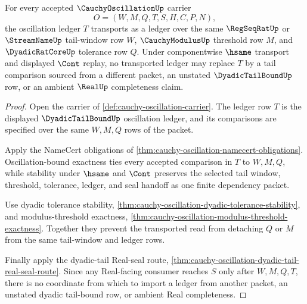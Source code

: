 \begin{theorem}
\label{thm:cauchy-oscillation-ledger-transport}
For every accepted $\CauchyOscillationUp$ carrier
$$
O=(W,M,Q,T,S,H,C,P,N),
$$
the oscillation ledger $T$ transports as a ledger over the same $\RegSeqRatUp$ or $\StreamNameUp$ tail-window row $W$, $\CauchyModulusUp$ threshold row $M$, and $\DyadicRatCoreUp$ tolerance row $Q$. Under componentwise $\hsame$ transport and displayed $\Cont$ replay, no transported ledger may replace $T$ by a tail comparison sourced from a different packet, an unstated $\DyadicTailBoundUp$ row, or an ambient $\RealUp$ completeness claim.
\end{theorem}
\begin{proof}
Open the carrier of \autoref{def:cauchy-oscillation-carrier}. The ledger row $T$ is the displayed $\DyadicTailBoundUp$ oscillation ledger, and its comparisons are specified over the same $W,M,Q$ rows of the packet.

Apply the NameCert obligations of \autoref{thm:cauchy-oscillation-namecert-obligations}. Oscillation-bound exactness ties every accepted comparison in $T$ to $W,M,Q$, while stability under $\hsame$ and $\Cont$ preserves the selected tail window, threshold, tolerance, ledger, and seal handoff as one finite dependency packet.

Use dyadic tolerance stability, \autoref{thm:cauchy-oscillation-dyadic-tolerance-stability}, and modulus-threshold exactness, \autoref{thm:cauchy-oscillation-modulus-threshold-exactness}. Together they prevent the transported read from detaching $Q$ or $M$ from the same tail-window and ledger rows.

Finally apply the dyadic-tail Real-seal route, \autoref{thm:cauchy-oscillation-dyadic-tail-real-seal-route}. Since any Real-facing consumer reaches $S$ only after $W,M,Q,T$, there is no coordinate from which to import a ledger from another packet, an unstated dyadic tail-bound row, or ambient Real completeness.
\end{proof}

